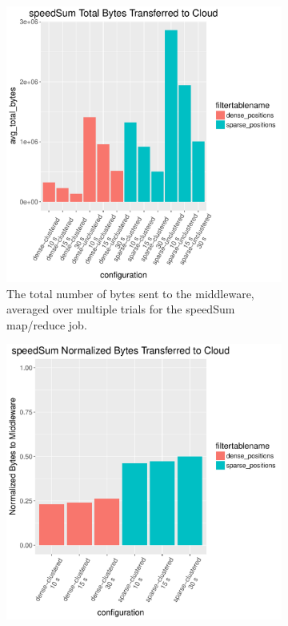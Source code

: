 \documentclass{thesis}
\begin{document}
    \begin{figure}
        \centering
        \begin{subfigure}[h]{0.45\textwidth}
            \centering
            \includegraphics[width=\textwidth]{binImages/speedSum-runplot.pdf}
            \caption{The total number of bytes sent to the middleware,
            averaged over multiple trials for the speedSum map/reduce job.} 
        \end{subfigure}
        \begin{subfigure}[h]{0.45\textwidth}
            \centering
            \includegraphics[width=\textwidth]{binImages/speedSum-runplot-normalized.pdf}

\end{subfigure}
\end{figure}
\end{document}
